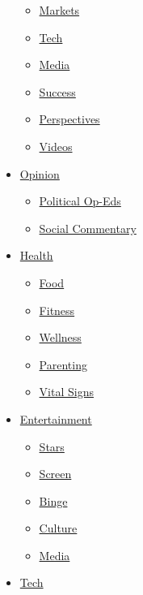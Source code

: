 \begin{itemize}
  \begin{itemize}
  \tightlist
  \item
    \href{https://money.cnn.com/data/markets/}{Markets}
  \item
    \href{/business/tech}{Tech}
  \item
    \href{/business/media}{Media}
  \item
    \href{/business/success}{Success}
  \item
    \href{/business/perspectives}{Perspectives}
  \item
    \href{/business/videos}{Videos}
  \end{itemize}
\item
  \href{/opinions}{Opinion}

  \begin{itemize}
  \tightlist
  \item
    \href{/specials/opinion/opinion-politics}{Political Op-Eds}
  \item
    \href{/specials/opinion/opinion-social-issues}{Social Commentary}
  \end{itemize}
\item
  \href{/health}{Health}

  \begin{itemize}
  \tightlist
  \item
    \href{/specials/health/food-diet}{Food}
  \item
    \href{/specials/health/fitness-excercise}{Fitness}
  \item
    \href{/specials/health/wellness}{Wellness}
  \item
    \href{/specials/health/parenting}{Parenting}
  \item
    \href{/specials/health/vital-signs}{Vital Signs}
  \end{itemize}
\item
  \href{/entertainment}{Entertainment}

  \begin{itemize}
  \tightlist
  \item
    \href{/entertainment/celebrities}{Stars}
  \item
    \href{/entertainment/movies}{Screen}
  \item
    \href{/entertainment/tv-shows}{Binge}
  \item
    \href{/entertainment/culture}{Culture}
  \item
    \href{/business/media}{Media}
  \end{itemize}
\item
  \href{/business/tech}{Tech}


\end{itemize}
